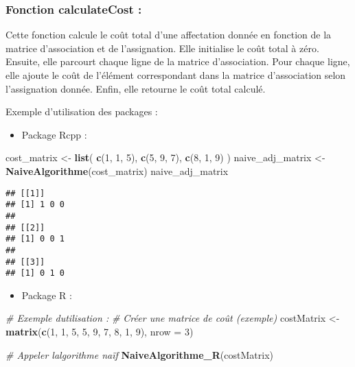 \documentclass[
]{article}
\newenvironment{Shaded}{\begin{snugshade}}{\end{snugshade}}
\newcommand{\AttributeTok}[1]{\textcolor[rgb]{0.13,0.29,0.53}{#1}}
\newcommand{\CommentTok}[1]{\textcolor[rgb]{0.56,0.35,0.01}{\textit{#1}}}
\newcommand{\DecValTok}[1]{\textcolor[rgb]{0.00,0.00,0.81}{#1}}
\newcommand{\FunctionTok}[1]{\textcolor[rgb]{0.13,0.29,0.53}{\textbf{#1}}}
\newcommand{\NormalTok}[1]{#1}
\newcommand{\OtherTok}[1]{\textcolor[rgb]{0.56,0.35,0.01}{#1}}
\providecommand{\tightlist}{%
  \setlength{\itemsep}{0pt}\setlength{\parskip}{0pt}}
\begin{document}
\hypertarget{fonction-calculatecost}{%
\subsubsection{Fonction calculateCost :}\label{fonction-calculatecost}}

Cette fonction calcule le coût total d'une affectation donnée en
fonction de la matrice d'association et de l'assignation. Elle
initialise le coût total à zéro. Ensuite, elle parcourt chaque ligne de
la matrice d'association. Pour chaque ligne, elle ajoute le coût de
l'élément correspondant dans la matrice d'association selon
l'assignation donnée. Enfin, elle retourne le coût total calculé.

Exemple d'utilisation des packages :

\begin{itemize}
\tightlist
\item
  Package Rcpp :
\end{itemize}

\begin{Shaded}
\begin{Highlighting}[]
\NormalTok{cost\_matrix }\OtherTok{\textless{}{-}} \FunctionTok{list}\NormalTok{(}
  \FunctionTok{c}\NormalTok{(}\DecValTok{1}\NormalTok{, }\DecValTok{1}\NormalTok{, }\DecValTok{5}\NormalTok{),}
  \FunctionTok{c}\NormalTok{(}\DecValTok{5}\NormalTok{, }\DecValTok{9}\NormalTok{, }\DecValTok{7}\NormalTok{),}
  \FunctionTok{c}\NormalTok{(}\DecValTok{8}\NormalTok{, }\DecValTok{1}\NormalTok{, }\DecValTok{9}\NormalTok{)}
\NormalTok{)}
\NormalTok{naive\_adj\_matrix }\OtherTok{\textless{}{-}} \FunctionTok{NaiveAlgorithme}\NormalTok{(cost\_matrix)}
\NormalTok{naive\_adj\_matrix}
\end{Highlighting}
\end{Shaded}

\begin{verbatim}
## [[1]]
## [1] 1 0 0
## 
## [[2]]
## [1] 0 0 1
## 
## [[3]]
## [1] 0 1 0
\end{verbatim}

\begin{itemize}
\tightlist
\item
  Package R :
\end{itemize}

\begin{Shaded}
\begin{Highlighting}[]
\CommentTok{\# Exemple d\textquotesingle{}utilisation :}
\CommentTok{\# Créer une matrice de coût (exemple)}
\NormalTok{costMatrix }\OtherTok{\textless{}{-}} \FunctionTok{matrix}\NormalTok{(}\FunctionTok{c}\NormalTok{(}\DecValTok{1}\NormalTok{, }\DecValTok{1}\NormalTok{, }\DecValTok{5}\NormalTok{, }\DecValTok{5}\NormalTok{, }\DecValTok{9}\NormalTok{, }\DecValTok{7}\NormalTok{, }\DecValTok{8}\NormalTok{, }\DecValTok{1}\NormalTok{, }\DecValTok{9}\NormalTok{), }\AttributeTok{nrow =} \DecValTok{3}\NormalTok{)}

\CommentTok{\# Appeler l\textquotesingle{}algorithme naïf}
\FunctionTok{NaiveAlgorithme\_R}\NormalTok{(costMatrix)}
\end{Highlighting}
\end{Shaded}
\end{document}
